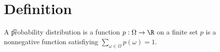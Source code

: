 
\section*{Definition}

A \t{probability distribution} is a function $p: \Omega  \to \R $ on a finite set $p$ is a nonnegative function satisfiying $\sum_{\omega  \in \Omega } p(\omega ) = 1$.

\blankpage